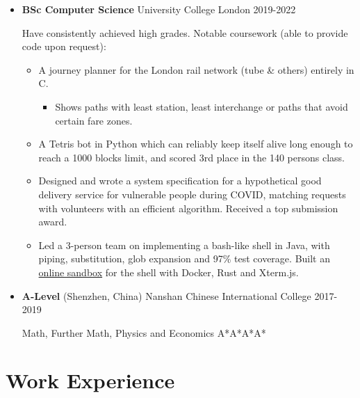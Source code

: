   \begin{itemize}
    \item \textbf{BSc Computer Science} \dashdiv{} University College London \dashdiv{} 2019-2022

      Have consistently achieved high grades. Notable coursework (able to provide code upon request):

      \begin{itemize}
        \item A journey planner for the\tflicon{} London rail network (tube \& others) entirely in C.

        \begin{itemize}
          \item Shows paths with least station, least interchange or paths that avoid certain fare zones.
        \end{itemize}

        \item A Tetris bot in Python which can reliably keep itself alive long enough to reach a 1000 blocks limit, and scored 3rd place in the 140 persons class.

        \item Designed and wrote a system specification for a hypothetical good delivery service for vulnerable people during COVID, matching requests with volunteers with an efficient algorithm. Received a top submission award.

        \item Led a 3-person team on implementing a bash-like shell in Java, with piping, substitution, glob expansion and 97\% test coverage. Built an \href{https://jsh-sandbox.maowtm.org}{\color{link}online sandbox} for the shell with Docker, Rust and Xterm.js.
      \end{itemize}

    \item \textbf{A-Level} \dashdiv{} (Shenzhen, China) Nanshan Chinese International College \dashdiv{} 2017-2019

      Math, Further Math, Physics and Economics \dashdiv{} A*A*A*A*
  \end{itemize}

  \section{Work Experience}

